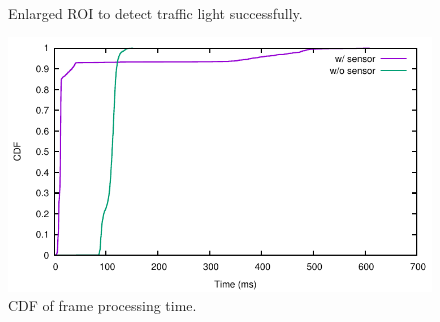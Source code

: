 \begin{figure}[!ht]
\centering
{}\\

\caption{Enlarged ROI to detect traffic light successfully.}
\label{f:rec_enl}
\end{figure}




\begin{figure}
\centering
\includegraphics[width=5.2in]{plots/cdf_time.pdf}
\caption{CDF of frame processing time.}
\label{f:cdf_time}
\end{figure}


